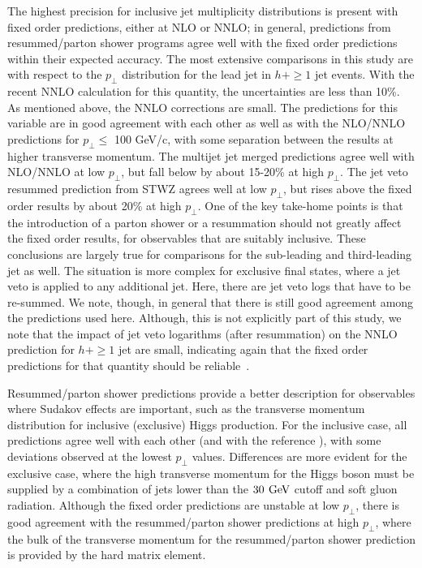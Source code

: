 The highest precision for inclusive jet multiplicity distributions is 
present with fixed order predictions, either at NLO or NNLO; in general, 
predictions from resummed/parton shower programs agree well with the 
fixed order predictions within their expected accuracy. The most 
extensive comparisons in this study are with respect to the $p_\perp$ 
distribution for the lead jet in $h+\ge1$ jet events. With the recent 
NNLO calculation for this quantity, the uncertainties are less than 10\%. 
As mentioned above, the NNLO corrections are small. The \NNLOPS 
predictions for this variable are in good agreement with each other 
as well as with the NLO/NNLO predictions for $p_\perp \le$ 100 GeV/c, with 
some separation between the \NNLOPS results at higher transverse momentum. 
The multijet jet merged predictions agree well with NLO/NNLO at low $p_\perp$, 
but fall below by about 15-20\% at high $p_\perp$. The jet veto resummed prediction from STWZ
agrees well at low $p_\perp$, but rises above the fixed order results 
by about 20\% at high $p_\perp$. One of the key take-home points is that 
the introduction of a parton shower or a resummation should not greatly 
affect the fixed order results, for observables that are suitably 
inclusive. These conclusions are largely true for comparisons for the 
sub-leading and third-leading jet as well. The situation is more complex 
for exclusive final states, where a jet veto is applied to any additional 
jet. Here, there are jet veto logs that have to be re-summed. We note, 
though, in general that there is still good agreement among the 
predictions used here. Although, this is not explicitly part of this 
study, we note that the impact of jet veto logarithms (after resummation) 
on the NNLO prediction for $h+\ge1$ jet are small, indicating again that 
the fixed order predictions for that quantity should be 
reliable~\cite{Banfi:2012jm,Banfi:2015pju}.

Resummed/parton shower predictions provide a better description for 
observables where Sudakov effects are important, such as the transverse 
momentum distribution for inclusive (exclusive) Higgs production. For 
the inclusive case, all predictions agree well with each other (and with 
the reference \HqT), with some deviations observed at the lowest $p_\perp$ 
values. Differences are more evident for the exclusive case, where the 
high transverse momentum for the Higgs boson must be supplied by a combination of 
jets lower than the $30\,\text{\:GeV}$ cutoff and soft gluon radiation. Although 
the fixed order predictions are unstable at low $p_\perp$, there is good 
agreement with the resummed/parton shower predictions at high $p_\perp$, 
where the bulk of the transverse momentum for the resummed/parton shower 
prediction is provided by the hard matrix element. 

